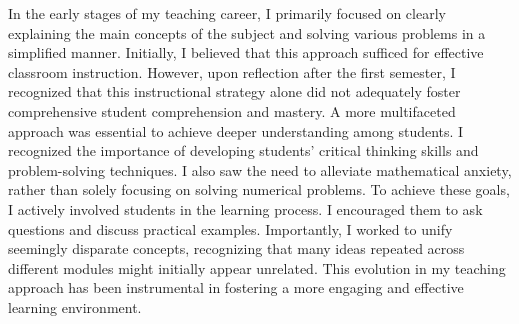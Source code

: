 \documentclass[11pt]{article}
\newcommand{\ignore}[1]{}
\begin{document}
In the early stages of my teaching career, I primarily focused on clearly explaining the main concepts of the subject and solving various problems in a simplified manner. Initially, I believed that this approach sufficed for effective classroom instruction. However, upon reflection after the first semester, I recognized that \ignore{while necessary,} this instructional strategy alone did not adequately foster comprehensive student comprehension and mastery. A more multifaceted approach was essential to achieve deeper understanding among students.
I recognized the importance of developing students' critical thinking skills and problem-solving techniques. I also saw the need to alleviate mathematical anxiety, %
rather than solely focusing on solving numerical problems.
To achieve these goals, I actively involved students in the learning process. I encouraged them to ask questions and discuss  practical \ignore{, real-world} examples. Importantly, I worked to unify seemingly disparate concepts, recognizing that many ideas repeated across different modules might initially appear unrelated.
This evolution in my teaching approach has been instrumental in fostering a more engaging and effective learning environment.


\end{document}
